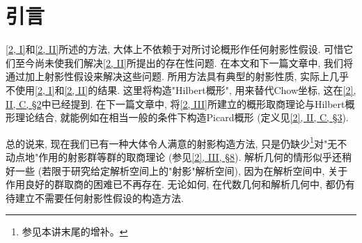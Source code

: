 \chapter{引言}\thispagestyle{fancy}\label{fga3.iv-introduction}
\par{}\hyperref[fga3.i]{[2, I]}和\hyperref[fga3.ii]{[2, II]}所述的方法, 大体上不依赖于对所讨论概形作任何射影性假设. 可惜它们至今尚未使我们解决\hyperref[fga3.ii]{[2, II]}所提出的存在性问题. 在本文和下一篇文章中, 我们将通过加上射影性假设来解决这些问题. 所用方法具有典型的射影性质, 实际上几乎不使用\hyperref[fga3.i]{[2, I]}和\hyperref[fga3.ii]{[2, II]}的结果. 这里将构造"Hilbert概形", 用来替代Chow坐标, 这在\hyperref[fga3.ii-c.2]{[2], II, C, §2}中已经提到. 在下一篇文章中, 将\hyperref[fga3.iii]{[2, III]}所建立的概形取商理论与Hilbert概形理论结合, 就能例如在相当一般的条件下构造Picard概形 (定义见\hyperref[fga3.ii-c.3]{[2], II, C, §3}).
\par{}总的说来, 现在我们已有一种大体令人满意的射影构造方法, 只是仍缺少\begingroup\renewcommand{\thefootnote}{*}\footnote{参见本讲末尾的增补。}\endgroup{}对"无不动点地"作用的射影群等群的取商理论 (参见\hyperref[fga3.iii-8]{[2], III, §8}). 解析几何的情形似乎还稍好一些 (若限于研究给定解析空间上的"射影"解析空间), 因为在解析空间中, 关于作用良好的群取商的困难已不再存在. 无论如何, 在代数几何和解析几何中, 都仍有待建立不需要任何射影性假设的构造方法.
